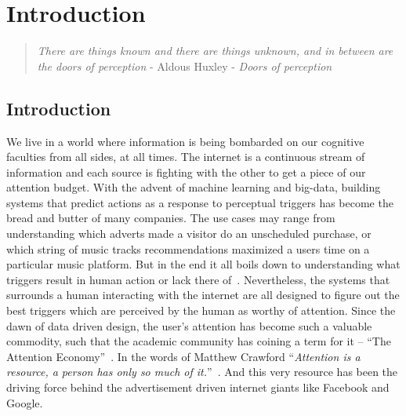
\chapter{Introduction}  %
\label{chap:Intro}

\graphicspath{{Chapter1/Figures/} {Chapter1/Figures}}
\begin{quote}
\textsl{There are things known and there are things unknown, and in between are the doors of perception} - Aldous Huxley - \textsl{Doors of perception}
\end{quote}


\section{Introduction}

We live in a world where information is being bombarded on our cognitive faculties from all sides, at all times. The internet is a continuous stream of information and each source is fighting with the other to get a piece of our attention budget. 
With the advent of machine learning and big-data, building systems that predict actions as a response to perceptual triggers has become the bread and butter of many companies. The use cases may range from understanding which adverts made a visitor do an unscheduled purchase, or which string of music tracks recommendations maximized a users time on a particular music platform. But in the end it all boils down to understanding what triggers result in human action or lack there of~\cite{song2012survey}. Nevertheless, the systems that surrounds a human interacting with the internet are all designed to figure out the best triggers which are perceived by the human as worthy of attention.
Since the dawn of data driven design, the user's attention has become such a valuable commodity, such that the academic community has coining a term for it -- ``The Attention Economy''~\cite{davenport2001attention}. In the words of Matthew Crawford ``\textit{Attention is a resource, a person has only so much of it.}''~\cite{MatthewCrawford}. And this very resource has been the driving force behind the advertisement driven internet giants like Facebook and Google. 

